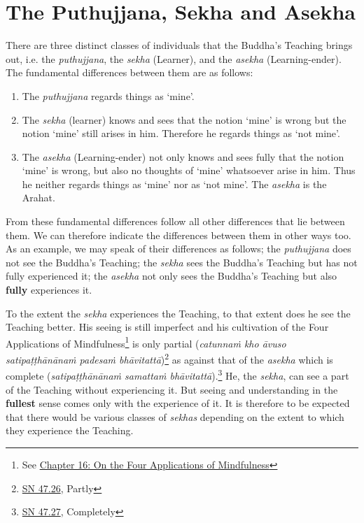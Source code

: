 \chapter{The Puthujjana, Sekha and Asekha}

There are three distinct classes of individuals that the Buddha's Teaching brings out, i.e. the \emph{puthujjana}, the \emph{sekha} (Learner), and the \emph{asekha} (Learning-ender). The fundamental differences between them are as follows:

\begin{enumerate}
\def\labelenumi{\arabic{enumi}.}
\item
  The \emph{puthujjana} regards things as `mine'.
\item
  The \emph{sekha} (learner) knows and sees that the notion `mine' is wrong but the notion `mine' still arises in him. Therefore he regards things as `not mine'.
\item
  The \emph{asekha} (Learning-ender) not only knows and sees fully that the notion `mine' is wrong, but also no thoughts of `mine' whatsoever arise in him. Thus he neither regards things as `mine' nor as `not mine'. The \emph{asekha} is the Arahat.
\end{enumerate}

From these fundamental differences follow all other differences that lie between them. We can therefore indicate the differences between them in other ways too. As an example, we may speak of their differences as follows; the \emph{puthujjana} does not see the Buddha's Teaching; the \emph{sekha} sees the Buddha's Teaching but has not fully experienced it; the \emph{asekha} not only sees the Buddha's Teaching but also \textbf{fully} experiences it.

To the extent the \emph{sekha} experiences the Teaching, to that extent does he see the Teaching better. His seeing is still imperfect and his cultivation of the Four Applications of Mindfulness\footnote{See \href{ch-16-satipatthana.xml\#start}{Chapter 16: On the Four Applications of Mindfulness}} is only partial (\emph{catunnaṁ kho āvuso satipaṭṭhānānaṁ padesaṁ bhāvitattā})\footnote{\href{https://suttacentral.net/sn47.26/en/bodhi}{SN 47.26}, Partly} as against that of the \emph{asekha} which is complete (\emph{satipaṭṭhānānaṁ samattaṁ bhāvitattā}).\footnote{\href{https://suttacentral.net/sn47.27/en/bodhi}{SN 47.27}, Completely} He, the \emph{sekha}, can see a part of the Teaching without experiencing it. But seeing and understanding in the \textbf{fullest} sense comes only with the experience of it. It is therefore to be expected that there would be various classes of \emph{sekhas} depending on the extent to which they experience the Teaching.

